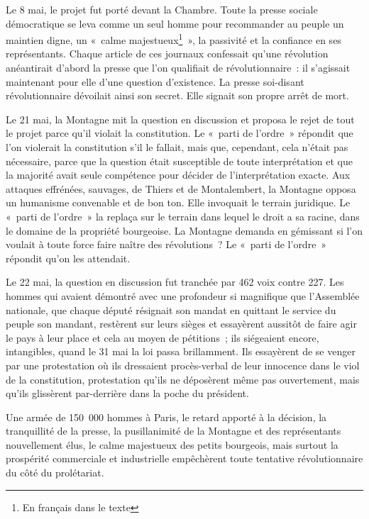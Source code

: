 \documentclass[twoside]{book} %
\begin{document}
Le 8 mai, le projet fut porté devant la Chambre. Toute la presse sociale démocratique se leva comme un seul homme pour recommander au peuple un maintien digne, un « calme majestueux\footnote{En français dans le texte} », la passivité et la confiance en ses représentants. Chaque article de ces journaux confessait qu’une révolution anéantirait d’abord la presse que l’on qualifiait de révolutionnaire : il s’agissait maintenant pour elle d’une question d’existence. La presse soi-disant révolutionnaire dévoilait ainsi son secret. Elle signait son propre arrêt de mort.\par
Le 21 mai, la Montagne mit la question en discussion et proposa le rejet de tout le projet parce qu’il violait la constitution. Le « parti de l’ordre » répondit que l’on violerait la constitution s’il le fallait, mais que, cependant, cela n’était pas nécessaire, parce que la question était susceptible de toute interprétation et que la majorité avait seule compétence pour décider de l’interprétation exacte. Aux attaques effrénées, sauvages, de Thiers et de Montalembert, la Montagne opposa un humanisme convenable et de bon ton. Elle invoquait le terrain juridique. Le « parti de l’ordre » la replaça sur le terrain dans lequel le droit a sa racine, dans le domaine de la propriété bourgeoise. La Montagne demanda en gémissant si l’on voulait à toute force faire naître des révolutions ? Le « parti de l’ordre » répondit qu’on les attendait.\par
Le 22 mai, la question en discussion fut tranchée par 462 voix contre 227. Les hommes qui avaient démontré avec une profondeur si magnifique que l’Assemblée nationale, que chaque député résignait son mandat en quittant le service du peuple son mandant, restèrent sur leurs sièges et essayèrent aussitôt de faire agir le pays à leur place et cela au moyen de pétitions ; ils siégeaient encore, intangibles, quand le 31 mai la loi passa brillamment. Ils essayèrent de se venger par une protestation où ils dressaient procès-verbal de leur innocence dans le viol de la constitution, protestation qu’ils ne déposèrent même pas ouvertement, mais qu’ils glissèrent par-derrière dans la poche du président.\par
Une armée de 150 000 hommes à Paris, le retard apporté à la décision, la tranquillité de la presse, la pusillanimité de la Montagne et des représentants nouvellement élus, le calme majestueux des petits bourgeois, mais surtout la prospérité commerciale et industrielle empêchèrent toute tentative révolutionnaire du côté du prolétariat.\par
\end{document}

